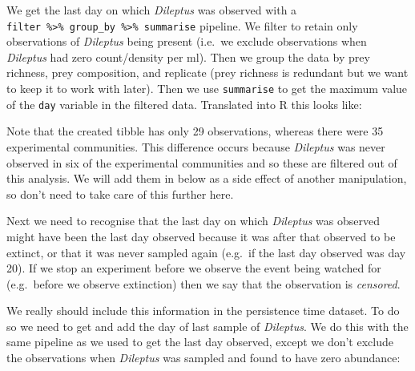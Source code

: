 \documentclass[]{book}
\newenvironment{Shaded}{\begin{snugshade}}{\end{snugshade}}
\newcommand{\DataTypeTok}[1]{\textcolor[rgb]{0.13,0.29,0.53}{#1}}
\newcommand{\DecValTok}[1]{\textcolor[rgb]{0.00,0.00,0.81}{#1}}
\newcommand{\KeywordTok}[1]{\textcolor[rgb]{0.13,0.29,0.53}{\textbf{#1}}}
\newcommand{\NormalTok}[1]{#1}
\newcommand{\OperatorTok}[1]{\textcolor[rgb]{0.81,0.36,0.00}{\textbf{#1}}}
\newcommand{\StringTok}[1]{\textcolor[rgb]{0.31,0.60,0.02}{#1}}
\begin{document}
We get the last day on which \emph{Dileptus} was observed with a \texttt{filter\ \%\textgreater{}\%\ group\_by\ \%\textgreater{}\%\ summarise} pipeline. We filter to retain only observations of \emph{Dileptus} being present (i.e.~we exclude observations when \emph{Dileptus} had zero count/density per ml). Then we group the data by prey richness, prey composition, and replicate (prey richness is redundant but we want to keep it to work with later). Then we use \texttt{summarise} to get the maximum value of the \texttt{day} variable in the filtered data. Translated into R this looks like:

\begin{Shaded}
\end{Shaded}

Note that the created tibble has only 29 observations, whereas there were 35 experimental communities. This difference occurs because \emph{Dileptus} was never observed in six of the experimental communities and so these are filtered out of this analysis. We will add them in below as a side effect of another manipulation, so don't need to take care of this further here.

Next we need to recognise that the last day on which \emph{Dileptus} was observed might have been the last day observed because it was after that observed to be extinct, or that it was never sampled again (e.g.~if the last day observed was day 20). If we stop an experiment before we observe the event being watched for (e.g.~before we observe extinction) then we say that the observation is \emph{censored}.

We really should include this information in the persistence time dataset. To do so we need to get and add the day of last sample of \emph{Dileptus}. We do this with the same pipeline as we used to get the last day observed, except we don't exclude the observations when \emph{Dileptus} was sampled and found to have zero abundance:
\end{document}
